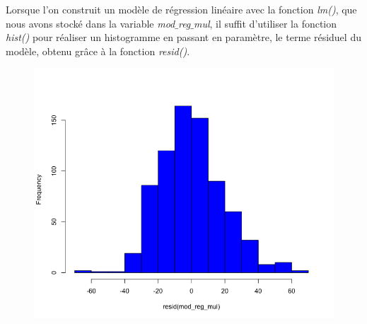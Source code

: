 Lorsque l'on construit un modèle de régression linéaire avec la fonction \textit{lm()}, que nous avons stocké dans la variable \textit{mod$\_$reg$\_$mul}, il suffit d'utiliser la fonction \textit{hist()} pour réaliser un histogramme en passant en paramètre, le terme résiduel du modèle, obtenu grâce à la fonction \textit{resid()}.

\begin{figure}[H]\begin{center}\includegraphics[scale=0.5]{ilu/cu.png}\end{center}\end{figure}

